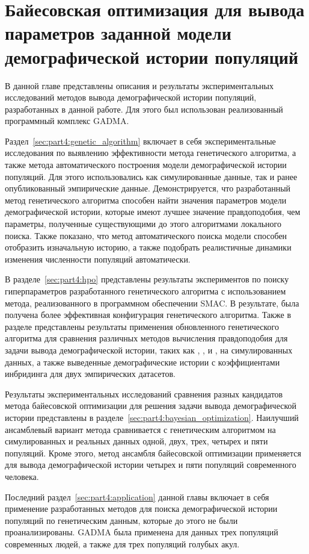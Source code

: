 \chapter{Байесовская оптимизация для вывода параметров заданной модели демографической истории популяций}
\label{sec:part4}

В данной главе представлены описания и результаты экспериментальных исследований методов вывода демографической истории популяций, разработанных в данной работе.
Для этого был использован реализованный программный комплекс GADMA.

Раздел~\ref{sec:part4:genetic_algorithm} включает в себя экспериментальные исследования по выявлению эффективности метода генетического алгоритма, а также метода автоматического построения модели демографической истории популяций.
Для этого использовались как симулированные данные, так и ранее опубликованный эмпирические данные.
Демонстрируется, что разработанный метод генетического алгоритма способен найти значения параметров модели демографической истории, которые имеют лучшее значение правдоподобия, чем параметры, полученные существующими до этого алгоритмами локального поиска.
Также показано, что метод автоматического поиска модели способен отобразить изначальную историю, а также подобрать реалистичные динамики изменения численности популяций автоматически.

В разделе~\ref{sec:part4:hpo} представлены результаты экспериментов по поиску гиперпараметров разработанного генетического алгоритма с использованием метода, реализованного в программном обеспечении SMAC.
В результате, была получена более эффективная конфигурация генетического алгоритма.
Также в разделе представлены результаты применения обновленного генетического алгоритма для сравнения различных методов вычисления правдоподобия для задачи вывода демографической истории, таких как \dadi, \moments, \momi и \momentsLD, на симулированных данных, а также выведенные демографические истории с коэффициентами инбридинга для двух эмпирических датасетов.

Результаты экспериментальных исследований сравнения разных кандидатов 
метода байесовской оптимизации для решения задачи вывода демографической истории представлены в разделе~\ref{sec:part4:bayesian_optimization}.
Наилучший ансамблевый вариант метода сравнивается с генетическим алгоритмом на симулированных и реальных данных одной, двух, трех, четырех и пяти популяций.
Кроме этого, метод ансамбля байесовской оптимизации применяется для вывода демографической истории четырех и пяти популяций современного человека.

Последний раздел~\ref{sec:part4:application} данной главы включает в себя применение разработанных методов для поиска демографической истории популяций по генетическим данным, которые до этого не были проанализированы.
GADMA была применена для данных трех популяций современных людей, а также для трех популяций голубых акул.



